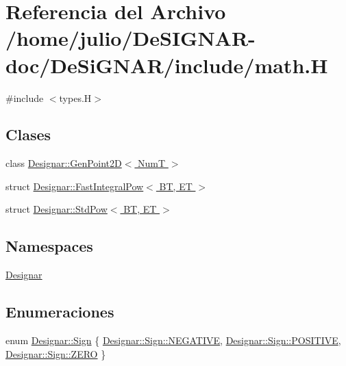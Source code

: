 \hypertarget{math_8_h}{}\section{Referencia del Archivo /home/julio/\+De\+S\+I\+G\+N\+A\+R-\/doc/\+De\+Si\+G\+N\+A\+R/include/math.H}
\label{math_8_h}
{\ttfamily \#include $<$types.\+H$>$}\newline
\subsection*{Clases}
\begin{DoxyCompactItemize}
\item 
class \hyperlink{class_designar_1_1_gen_point2_d}{Designar\+::\+Gen\+Point2\+D$<$ Num\+T $>$}
\item 
struct \hyperlink{struct_designar_1_1_fast_integral_pow}{Designar\+::\+Fast\+Integral\+Pow$<$ B\+T, E\+T $>$}
\item 
struct \hyperlink{struct_designar_1_1_std_pow}{Designar\+::\+Std\+Pow$<$ B\+T, E\+T $>$}
\end{DoxyCompactItemize}
\subsection*{Namespaces}
\begin{DoxyCompactItemize}
\item 
 \hyperlink{namespace_designar}{Designar}
\end{DoxyCompactItemize}
\subsection*{Enumeraciones}
\begin{DoxyCompactItemize}
\item 
enum \hyperlink{namespace_designar_aee82690b26e153ff9bcb37b8144b83f4}{Designar\+::\+Sign} \{ \hyperlink{namespace_designar_aee82690b26e153ff9bcb37b8144b83f4a50546bf973283065b6ccf09faf7a580a}{Designar\+::\+Sign\+::\+N\+E\+G\+A\+T\+I\+VE}, 
\hyperlink{namespace_designar_aee82690b26e153ff9bcb37b8144b83f4aab6c31432785221bae58327ef5f6ea58}{Designar\+::\+Sign\+::\+P\+O\+S\+I\+T\+I\+VE}, 
\hyperlink{namespace_designar_aee82690b26e153ff9bcb37b8144b83f4a529e9e0beb5f85d1f132917c1a09860c}{Designar\+::\+Sign\+::\+Z\+E\+RO}
 \}
\end{DoxyCompactItemize}
